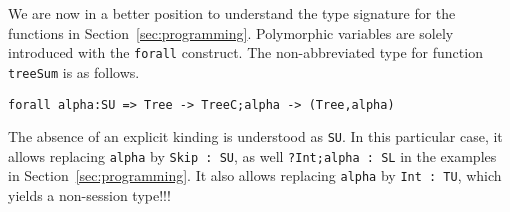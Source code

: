 We are now in a better position to understand the type signature for
the functions in Section~\ref{sec:programming}.  Polymorphic variables
are solely introduced with the \lstinline|forall| construct. The
non-abbreviated type for function \lstinline|treeSum| is as follows.
%
\begin{lstlisting}
forall alpha:SU => Tree -> TreeC;alpha -> (Tree,alpha)
\end{lstlisting}
%
The absence of an explicit kinding is understood as \lstinline|SU|. In
this particular case, it allows replacing \lstinline|alpha| by
\lstinline|Skip : SU|, as well \lstinline|?Int;alpha : SL| in the examples
in Section~\ref{sec:programming}.
%
It also allows  replacing \lstinline|alpha| by \lstinline|Int : TU|,
which yields a non-session type!!!

